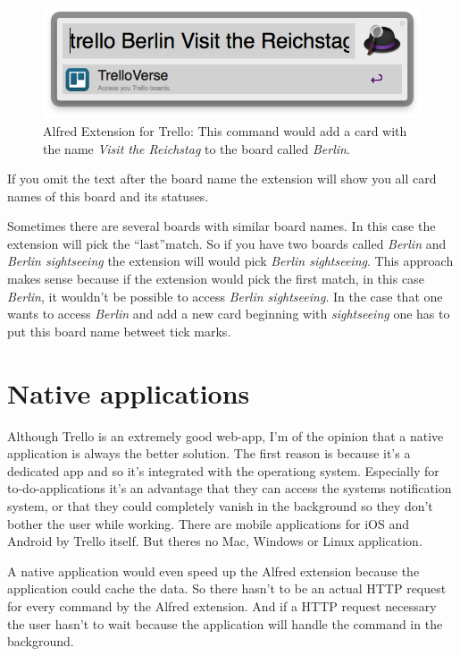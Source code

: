\begin{figure}[htb]
\centering
\includegraphics[width=\textwidth]{figures/trello-ext.png}
\caption{Alfred Extension for Trello: This command would add a card with the name \emph{Visit the Reichstag} to the board called \emph{Berlin}.}
\label{fig:trello-ext}
\end{figure}

If you omit the text after the board name the extension will show you all card names of this board and its statuses.

Sometimes there are several boards with similar board names. In this case the extension will pick the \textquotedblleft last\textquotedblright match. So if you have two boards called \emph{Berlin} and \emph{Berlin sightseeing} the extension will would pick \emph{Berlin sightseeing}. This approach makes sense because if the extension would pick the first match, in this case \emph{Berlin}, it wouldn't be possible to access \emph{Berlin sightseeing}. In the case that one wants to access \emph{Berlin} and add a new card beginning with \emph{sightseeing} one has to put this board name betweet tick marks.


\section{Native applications}
Although Trello is an extremely good web-app, I'm of the opinion that a native application is always the better solution. The first reason is because it's a dedicated app and so it's integrated with the operationg system. Especially for to-do-applications it's an advantage that they can access the systems notification system, or that they could completely vanish in the background so they don't bother the user while working. There are mobile applications for iOS \cite{trello:ios} and Android \cite{trello:android} by Trello itself. But theres no Mac, Windows or Linux application.

A native application would even speed up the Alfred extension because the application could cache the data. So there hasn't to be an actual HTTP request for every command by the Alfred extension. And if a HTTP request necessary the user hasn't to wait because the application will handle the command in the background.